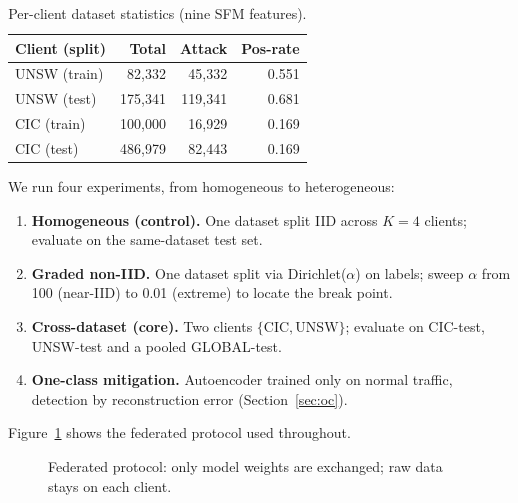\documentclass[11pt,a4paper]{article}
\begin{document}
\begin{table}[h]
\centering\small
\caption{Per-client dataset statistics (nine SFM features).}
\label{tab:data}
\begin{tabular}{@{}lrrr@{}}
\toprule
Client (split) & Total & Attack & Pos-rate \\
\midrule
UNSW (train) & 82{,}332  & 45{,}332 & 0.551 \\
UNSW (test)  & 175{,}341 & 119{,}341 & 0.681 \\
CIC (train)  & 100{,}000 & 16{,}929 & 0.169 \\
CIC (test)   & 486{,}979 & 82{,}443 & 0.169 \\
\bottomrule
\end{tabular}
\end{table}

We run four experiments, from homogeneous to heterogeneous:
\begin{enumerate}[leftmargin=1.6em]
  \item \textbf{Homogeneous (control).} One dataset split IID across \(K=4\)
  clients; evaluate on the same-dataset test set.
  \item \textbf{Graded non-IID.} One dataset split via Dirichlet(\(\alpha\)) on
  labels; sweep \(\alpha\) from 100 (near-IID) to 0.01 (extreme) to locate the
  break point.
  \item \textbf{Cross-dataset (core).} Two clients \(\{\text{CIC},\text{UNSW}\}\);
  evaluate on CIC-test, UNSW-test and a pooled GLOBAL-test.
  \item \textbf{One-class mitigation.} Autoencoder trained only on normal traffic,
  detection by reconstruction error (Section~\ref{sec:oc}).
\end{enumerate}

Figure~\ref{fig:fl} shows the federated protocol used throughout.

\begin{figure}[h]
\centering
{}
\caption{Federated protocol: only model weights are exchanged; raw data stays on
each client.}
\label{fig:fl}
\end{figure}
\end{document}
